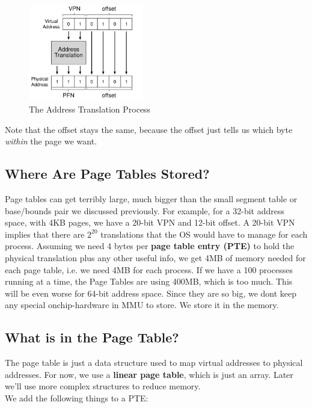 \begin{figure}[h!]
    \begin{center}
        \includegraphics[width=5cm]{img/183.png}
        \caption{The Address Translation Process}
    \end{center}
\end{figure}

Note that the offset stays the same, because the offset just tells us which
byte \textit{within} the page we want.

\subsection{Where Are Page Tables Stored?}

Page tables can get terribly large, much bigger than the small segment table
or base/bounds pair we discussed previously. For example, for a 32-bit address
space, with 4KB pages, we have a 20-bit VPN and 12-bit offset. A 20-bit VPN
implies that there are $2^20$ translations that the OS would have to manage
for each process. Assuming we need 4 bytes per \textbf{page table entry (PTE)}
to hold the physical translation plus any other useful info, we get 4MB of 
memory needed for each page table, i.e. we need 4MB for each process. If we
have a 100 processes running at a time, the Page Tables are using 400MB, which
is too much. This will be even worse for 64-bit address space. Since they are
so big, we dont keep any special onchip-hardware in MMU to store. We store it
in the memory.

\subsection{What is in the Page Table?}

The page table is just a data structure used to map virtual addresses to
physical addresses. For now, we use a \textbf{linear page table}, which is
just an array. Later we'll use more complex structures to reduce memory.\\

We add the following things to a PTE:

